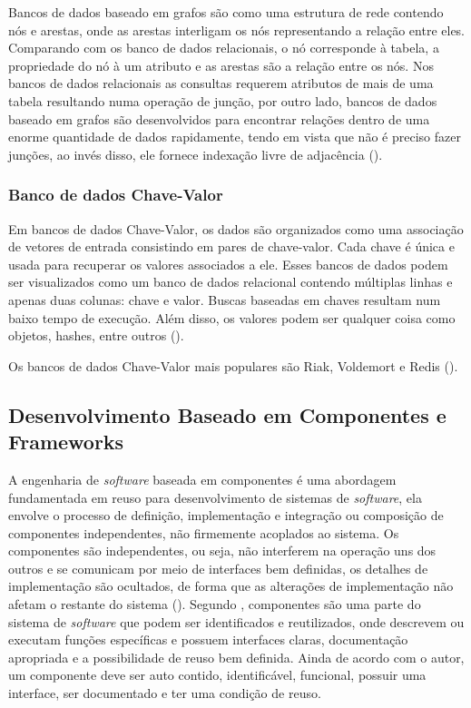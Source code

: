 Bancos de dados baseado em grafos são como uma estrutura de rede contendo nós e arestas, onde as arestas interligam os nós representando a relação entre eles. Comparando com os banco de dados relacionais, o nó corresponde à tabela, a propriedade do nó à um atributo e as arestas são a relação entre os nós. Nos bancos de dados relacionais as consultas requerem atributos de mais de uma tabela resultando numa operação de junção, por outro lado, bancos de dados baseado em grafos são desenvolvidos para encontrar relações dentro de uma enorme quantidade de dados rapidamente, tendo em vista que não é preciso fazer junções, ao invés disso, ele fornece indexação livre de adjacência (\cite{kaur:2013}).

\subsubsection{Banco de dados Chave-Valor}

Em bancos de dados Chave-Valor, os dados são organizados como uma associação de vetores de entrada consistindo em pares de chave-valor. Cada chave é única e usada para recuperar os valores associados a ele. Esses bancos de dados podem ser visualizados como um banco de dados relacional contendo múltiplas linhas e apenas duas colunas: chave e valor. Buscas baseadas em chaves resultam num baixo tempo de execução. Além disso, os valores podem ser qualquer coisa como objetos, hashes, entre outros (\cite{kaur:2013}).

Os bancos de dados Chave-Valor mais populares são Riak, Voldemort e Redis (\cite{kaur:2013}).


\subsection{Desenvolvimento Baseado em Componentes e Frameworks}

A engenharia de \textit{software} baseada em componentes é uma abordagem fundamentada em reuso para desenvolvimento de sistemas de \textit{software}, ela envolve o processo de definição, implementação e integração ou composição de componentes independentes, não firmemente acoplados ao sistema. Os componentes são independentes, ou seja, não interferem na operação uns dos outros e se comunicam por meio de interfaces bem definidas, os detalhes de implementação são ocultados, de forma que as alterações de implementação não afetam o restante do sistema (\cite{sommerville:2013}). Segundo \cite{sametinger:1997}, componentes são uma parte do sistema de \textit{software} que podem ser identificados e reutilizados, onde descrevem ou executam funções específicas e possuem interfaces claras, documentação apropriada e a possibilidade de reuso bem definida. Ainda de acordo com o autor, um componente deve ser auto contido, identificável, funcional, possuir uma interface, ser documentado e ter uma condição de reuso. 

